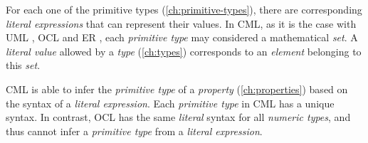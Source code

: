 For each one of the primitive types (\ref{ch:primitive-types}),
there are corresponding \emph{literal expressions}
that can represent their values.
In CML, as it is the case with UML \cite{uml}, OCL \cite{ocl} and ER \cite{er},
each \emph{primitive type} may considered a mathematical \emph{set}.
A \emph{literal value} allowed by a \emph{type} (\ref{ch:types})
corresponds to an \emph{element} belonging to this \emph{set}.

CML is able to infer the \emph{primitive type} of a \emph{property} (\ref{ch:properties})
based on the syntax of a \emph{literal expression}.
Each \emph{primitive type} in CML has a unique syntax.
In contrast,
OCL has the same \emph{literal} syntax for all \emph{numeric types},
and thus cannot infer a \emph{primitive type} from a \emph{literal expression}.
